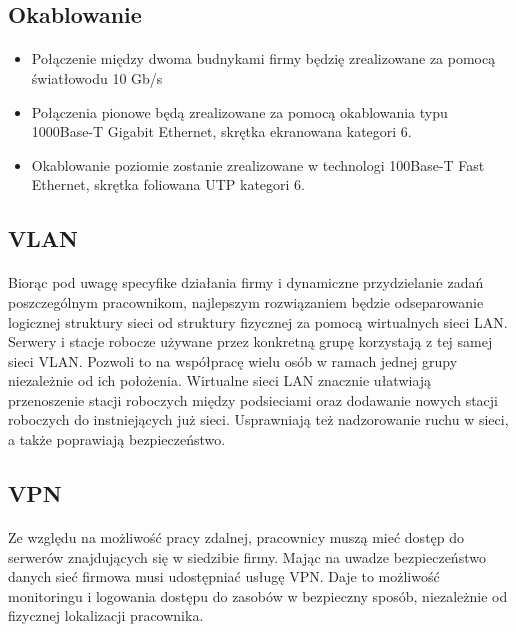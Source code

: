 \subsection{Okablowanie}
\paragraph{}


\begin{itemize}
  \item Połączenie między dwoma budnykami firmy będzię zrealizowane za pomocą światłowodu 10 Gb/s

  \item Połączenia pionowe będą zrealizowane za pomocą okablowania typu 1000Base-T Gigabit Ethernet, skrętka ekranowana kategori 6.

  \item Okablowanie poziomie zostanie zrealizowane w technologi 100Base-T Fast Ethernet, skrętka foliowana UTP kategori 6.

\end{itemize}

\subsection{VLAN}
\paragraph{}
Biorąc pod uwagę specyfike działania firmy i dynamiczne przydzielanie zadań poszczególnym pracownikom, najlepszym rozwiązaniem będzie odseparowanie logicznej struktury sieci od struktury fizycznej za pomocą wirtualnych sieci LAN. Serwery i stacje robocze używane przez konkretną grupę korzystają z tej samej sieci VLAN. Pozwoli to na współpracę wielu osób w ramach jednej grupy niezależnie od ich położenia. Wirtualne sieci LAN znacznie ułatwiają przenoszenie stacji roboczych między podsieciami oraz dodawanie nowych stacji roboczych do instniejących już sieci. Usprawniają też nadzorowanie ruchu w sieci, a także poprawiają bezpieczeństwo.

\subsection{VPN}
\paragraph{}
Ze względu na możliwość pracy zdalnej, pracownicy muszą mieć dostęp do serwerów znajdujących się w siedzibie firmy. Mając na uwadze bezpieczeństwo danych sieć firmowa musi udostępniać usługę VPN. Daje to możliwość monitoringu i logowania dostępu do zasobów w bezpieczny sposób, niezależnie od fizycznej lokalizacji pracownika.

